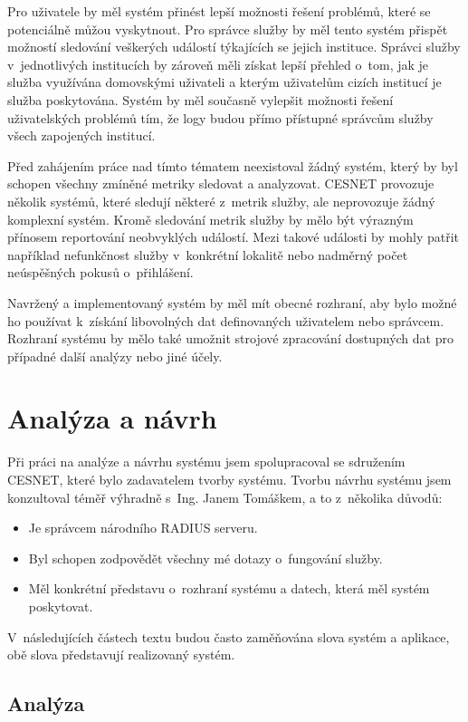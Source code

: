 \documentclass[thesis=M,czech]{FITthesis}[2012/06/26]
\begin{document}
  Pro uživatele by měl systém přinést lepší možnosti řešení problémů, které se potenciálně můžou vyskytnout.
  Pro správce služby by měl tento systém přispět možností sledování veškerých událostí týkajících se jejich instituce.
  Správci služby v~jednotlivých institucích by zároveň měli získat lepší přehled o~tom, 
  jak je služba využívána domovskými uživateli a kterým uživatelům cizích institucí je služba poskytována.
  Systém by měl současně vylepšit možnosti řešení uživatelských problémů tím, 
  že logy budou přímo přístupné správcům služby všech zapojených institucí.

  Před zahájením práce nad tímto tématem neexistoval žádný systém, který by byl schopen všechny zmíněné metriky sledovat a analyzovat.
  CESNET provozuje několik systémů, které sledují některé z~metrik služby, ale neprovozuje žádný komplexní systém.
  Kromě sledování metrik služby by mělo být výrazným přínosem reportování neobvyklých událostí.
  Mezi takové události by mohly patřit například nefunkčnost služby v~konkrétní lokalitě
  nebo nadměrný počet neúspěšných pokusů o~přihlášení.

  Navržený a implementovaný systém by měl mít obecné rozhraní, 
  aby bylo možné ho používat k~získání libovolných dat definovaných uživatelem nebo správcem.
  Rozhraní systému by mělo také umožnit strojové zpracování dostupných dat
  pro případné další analýzy nebo jiné účely.

\chapter{Analýza a návrh}

  Při práci na analýze a návrhu systému jsem spolupracoval se sdružením CESNET,
  které bylo zadavatelem tvorby systému.
  Tvorbu návrhu systému jsem konzultoval téměř výhradně s~Ing. Janem Tomáškem, a to z~několika důvodů:
  \begin{itemize}
    \item{Je správcem národního RADIUS serveru.}
    \item{Byl schopen zodpovědět všechny mé dotazy o~fungování služby.}
    \item{Měl konkrétní představu o~rozhraní systému a datech, která měl systém poskytovat.}
  \end{itemize}
  V~následujících částech textu budou často zaměňována slova systém a aplikace,
  obě slova představují realizovaný systém.

\section{Analýza}
 
\end{document}
